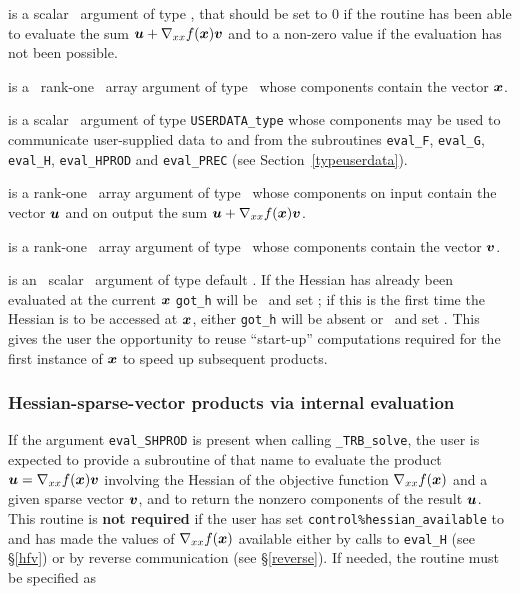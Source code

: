 \documentclass{galahad}
\newcommand{\packagename}{TRB}
\newcommand{\fullpackagename}{\libraryname\_\packagename}
\newcommand{\solver}{{\tt \fullpackagename\_solve}}
\begin{document}
\begin{description}
 is a scalar \intentout\ argument of type \integer,
that should be set to 0 if the routine has been able to evaluate the
sum ${\bm{u}} + \nabla_{xx} f({\bm{x}}) {\bm{v}}$
and to a non-zero value if the evaluation has not been possible.

 is a \ rank-one \intentin\ array argument of type
\realdp\ whose components contain the vector ${\bm{x}}$.

 is a scalar \intentinout\ argument of type
{\tt USERDATA\_type} whose components may be used
to communicate user-supplied data to and from the
subroutines {\tt eval\_F}, {\tt eval\_G},
{\tt eval\_H}, {\tt eval\_HPROD} and {\tt eval\_PREC}
(see Section~\ref{typeuserdata}).

 is a rank-one \intentinout\ array argument of type \realdp\
whose components on input contain the vector ${\bm{u}}$ and on output the
sum ${\bm{u}} + \nabla_{xx} f({\bm{x}}) {\bm{v}}$.

 is a rank-one \intentin\ array argument of type \realdp\
whose components contain the vector ${\bm{v}}$.

 is an \optional\ scalar \intentin\ argument of type default
\logical. If the Hessian has already been evaluated at the current ${\bm{x}}$
{\tt got\_h} will be \present\ and set \true; if this is the first time
the Hessian is to be accessed at ${\bm{x}}$, either {\tt got\_h} will be absent
or \present\ and set \false. This gives the user the opportunity
to reuse ``start-up'' computations required for the first instance of
${\bm{x}}$ to speed up subsequent products.

\end{description}


\subsubsection{Hessian-sparse-vector products via internal evaluation\label{hvsv}}

If the argument {\tt eval\_SHPROD} is present when calling \solver, the
user is expected to provide a subroutine of that name to evaluate the
product ${\bm{u}} = \nabla_{xx} f({\bm{x}}) {\bm{v}}$ involving 
the Hessian of the objective function $\nabla_{xx} f({\bm{x}})$
and a given sparse vector ${\bm{v}}$, and to return the nonzero components 
of the result ${\bm{u}}$. 
This routine is {\bf not required} if the user has set 
{\tt control\%hessian\_available} to \true\, and has made 
the values of $\nabla_{xx} f({\bm{x}})$ available either by calls to 
{\tt eval\_H} (see \S\ref{hfv})
or by reverse communication (see \S\ref{reverse}).
If needed, the routine must be specified as
\end{document}
